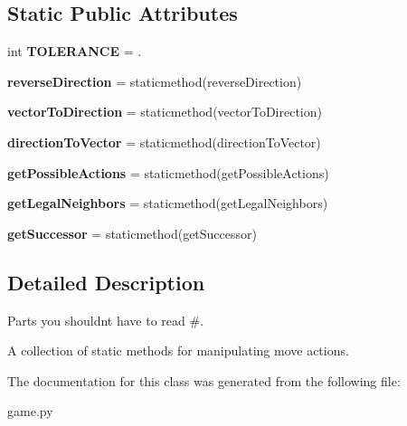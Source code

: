\subsection*{Static Public Attributes}
\begin{DoxyCompactItemize}
\item 
\mbox{\label{classgame_1_1_actions_a5e5ee1386185ca599e94b2b4f55f79e3}} 
int {\bfseries T\+O\+L\+E\+R\+A\+N\+CE} = .
\item 
\mbox{\label{classgame_1_1_actions_a6f924517b93f847c3269206c93b5b7c5}} 
{\bfseries reverse\+Direction} = staticmethod(reverse\+Direction)
\item 
\mbox{\label{classgame_1_1_actions_abb36703362b3e4e04e3d964309075d4b}} 
{\bfseries vector\+To\+Direction} = staticmethod(vector\+To\+Direction)
\item 
\mbox{\label{classgame_1_1_actions_ab3c148fcb3e6feb3a637e7f92de104bc}} 
{\bfseries direction\+To\+Vector} = staticmethod(direction\+To\+Vector)
\item 
\mbox{\label{classgame_1_1_actions_aca4469465367fb266ebfe8ab48fc3d4e}} 
{\bfseries get\+Possible\+Actions} = staticmethod(get\+Possible\+Actions)
\item 
\mbox{\label{classgame_1_1_actions_ad79409d49347edd6d7e0558dce0617e5}} 
{\bfseries get\+Legal\+Neighbors} = staticmethod(get\+Legal\+Neighbors)
\item 
\mbox{\label{classgame_1_1_actions_a4b1b3732c26dda35129d5c610a913e53}} 
{\bfseries get\+Successor} = staticmethod(get\+Successor)
\end{DoxyCompactItemize}


\subsection{Detailed Description}
Parts you shouldn\textquotesingle{}t have to read \#. 

\begin{DoxyVerb}A collection of static methods for manipulating move actions.
\end{DoxyVerb}
 

The documentation for this class was generated from the following file\+:\begin{DoxyCompactItemize}
\item 
game.\+py\end{DoxyCompactItemize}
